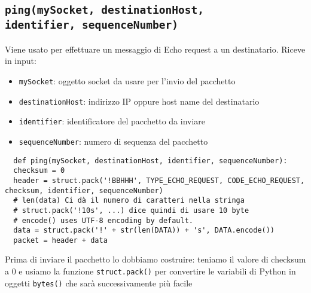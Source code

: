 \documentclass[a4paper,12pt]{report}
\begin{document}
\subsection*{\texttt{ping(mySocket, destinationHost,\\ identifier, sequenceNumber)}}
Viene usato per effettuare un messaggio di Echo request a un destinatario.
Riceve in input:
\begin{itemize} 
  \item \texttt{mySocket}: oggetto socket da usare per l'invio del pacchetto
  \item \texttt{destinationHost}: indirizzo IP oppure host name del destinatario
  \item \texttt{identifier}: identificatore del pacchetto da inviare
  \item \texttt{sequenceNumber}: numero di sequenza del pacchetto
\end{itemize}
\begin{verbatim}
  def ping(mySocket, destinationHost, identifier, sequenceNumber):
  checksum = 0
  header = struct.pack('!BBHHH', TYPE_ECHO_REQUEST, CODE_ECHO_REQUEST, checksum, identifier, sequenceNumber)
  # len(data) Ci dà il numero di caratteri nella stringa
  # struct.pack('!10s', ...) dice quindi di usare 10 byte
  # encode() uses UTF-8 encoding by default. 
  data = struct.pack('!' + str(len(DATA)) + 's', DATA.encode())
  packet = header + data
\end{verbatim}
Prima di inviare il pacchetto lo dobbiamo costruire: teniamo il valore di checksum a 0 e usiamo la funzione \texttt{struct.pack()} per convertire le variabili di Python in oggetti \texttt{bytes()} che sarà successivamente più facile 
\end{document}
